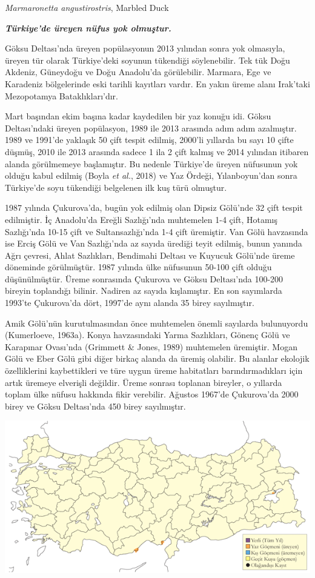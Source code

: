 \documentclass[
  a4paper,
  DIV=11,
  numbers=noendperiod]{scrreprt}
\begin{document}
\emph{Marmaronetta angustirostris}, Marbled Duck

\textbf{\emph{Türkiye'de üreyen nüfus yok olmuştur.}}

Göksu Deltası'nda üreyen popülasyonun 2013 yılından sonra yok olmasıyla,
üreyen tür olarak Türkiye'deki soyunun tükendiği söylenebilir. Tek tük
Doğu Akdeniz, Güneydoğu ve Doğu Anadolu'da görülebilir. Marmara, Ege ve
Karadeniz bölgelerinde eski tarihli kayıtları vardır. En yakın üreme
alanı Irak'taki Mezopotamya Bataklıkları'dır.

Mart başından ekim başına kadar kaydedilen bir yaz konuğu idi. Göksu
Deltası'ndaki üreyen popülasyon, 1989 ile 2013 arasında adım adım
azalmıştır. 1989 ve 1991'de yaklaşık 50 çift tespit edilmiş, 2000'li
yıllarda bu sayı 10 çifte düşmüş, 2010 ile 2013 arasında sadece 1 ila 2
çift kalmış ve 2014 yılından itibaren alanda görülmemeye başlamıştır. Bu
nedenle Türkiye'de üreyen nüfusunun yok olduğu kabul edilmiş (Boyla
\emph{et al.}, 2018) ve Yaz Ördeği, Yılanboyun'dan sonra Türkiye'de soyu
tükendiği belgelenen ilk kuş türü olmuştur.

1987 yılında Çukurova'da, bugün yok edilmiş olan Dipsiz Gölü'nde 32 çift
tespit edilmiştir. İç Anadolu'da Ereğli Sazlığı'nda muhtemelen 1-4 çift,
Hotamış Sazlığı'nda 10-15 çift ve Sultansazlığı'nda 1-4 çift üremiştir.
Van Gölü havzasında ise Erciş Gölü ve Van Sazlığı'nda az sayıda ürediği
teyit edilmiş, bunun yanında Ağrı çevresi, Ahlat Sazlıkları, Bendimahi
Deltası ve Kuyucuk Gölü'nde üreme döneminde görülmüştür. 1987 yılında
ülke nüfusunun 50-100 çift olduğu düşünülmüştür. Üreme sonrasında
Çukurova ve Göksu Deltası'nda 100-200 bireyin toplandığı bilinir.
Nadiren az sayıda kışlamıştır. En son sayımlarda 1993'te Çukurova'da
dört, 1997'de aynı alanda 35 birey sayılmıştır.

Amik Gölü'nün kurutulmasından önce muhtemelen önemli sayılarda
bulunuyordu (Kumerloeve, 1963a). Konya havzasındaki Yarma Sazlıkları,
Gönenç Gölü ve Karapınar Ovası'nda (Grimmett \& Jones, 1989) muhtemelen
üremiştir. Mogan Gölü ve Eber Gölü gibi diğer birkaç alanda da üremiş
olabilir. Bu alanlar ekolojik özelliklerini kaybettikleri ve türe uygun
üreme habitatları barındırmadıkları için artık üremeye elverişli
değildir. Üreme sonrası toplanan bireyler, o yıllarda toplam ülke nüfusu
hakkında fikir verebilir. Ağustos 1967'de Çukurova'da 2000 birey ve
Göksu Deltası'nda 450 birey sayılmıştır.

\includegraphics{images/harita_Page_021.png}
\end{document}
